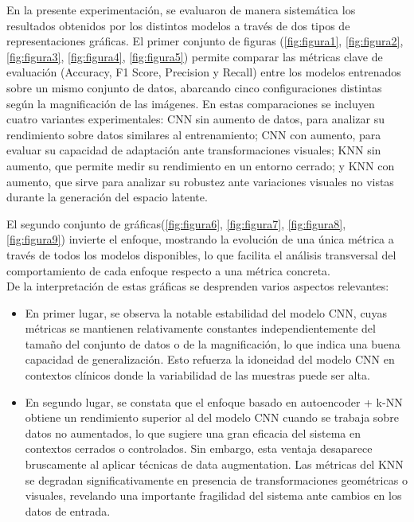 \documentclass[12pt]{article} %
\begin{document}
\newpage
En la presente experimentación, se evaluaron de manera sistemática los resultados obtenidos por los distintos modelos a través de dos tipos de representaciones gráficas. El primer conjunto de figuras (\ref{fig:figura1}, \ref{fig:figura2}, \ref{fig:figura3}, \ref{fig:figura4}, \ref{fig:figura5}) permite comparar las métricas clave de evaluación (Accuracy, F1 Score, Precision y Recall) entre los modelos entrenados sobre un mismo conjunto de datos, abarcando cinco configuraciones distintas según la magnificación de las imágenes. En estas comparaciones se incluyen cuatro variantes experimentales: CNN sin aumento de datos, para analizar su rendimiento sobre datos similares al entrenamiento; CNN con aumento, para evaluar su capacidad de adaptación ante transformaciones visuales; KNN sin aumento, que permite medir su rendimiento en un entorno cerrado; y KNN con aumento, que sirve para analizar su robustez ante variaciones visuales no vistas durante la generación del espacio latente.

El segundo conjunto de gráficas(\ref{fig:figura6}, \ref{fig:figura7}, \ref{fig:figura8}, \ref{fig:figura9}) invierte el enfoque, mostrando la evolución de una única métrica a través de todos los modelos disponibles, lo que facilita el análisis transversal del comportamiento de cada enfoque respecto a una métrica concreta. \\

De la interpretación de estas gráficas se desprenden varios aspectos relevantes: 

\begin{itemize}
    \item En primer lugar, se observa la notable estabilidad del modelo CNN, cuyas métricas se mantienen relativamente constantes independientemente del tamaño del conjunto de datos o de la magnificación, lo que indica una buena capacidad de generalización. Esto refuerza la idoneidad del modelo CNN en contextos clínicos donde la variabilidad de las muestras puede ser alta.
    \item En segundo lugar, se constata que el enfoque basado en autoencoder + k-NN obtiene un rendimiento superior al del modelo CNN cuando se trabaja sobre datos no aumentados, lo que sugiere una gran eficacia del sistema en contextos cerrados o controlados. Sin embargo, esta ventaja desaparece bruscamente al aplicar técnicas de data augmentation. Las métricas del KNN se degradan significativamente en presencia de transformaciones geométricas o visuales, revelando una importante fragilidad del sistema ante cambios en los datos de entrada.
\end{itemize}
\end{document}
